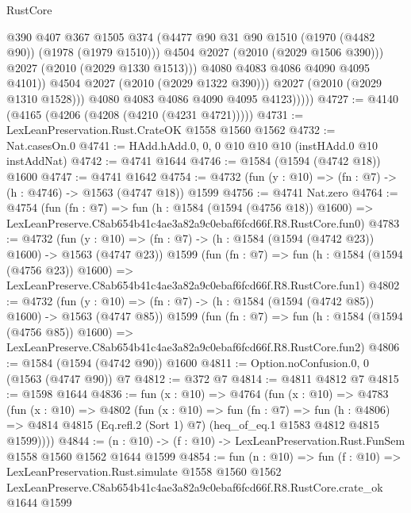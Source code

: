 \begin{lexlean}{RustCore}
\begin{coremodule}
                          @390
                          @407
                          @367
                          @1505
                          @374
                          (@4477 @90 @31 @90 @1510 (@1970 (@4482 @90)) (@1978 (@1979 @1510)))
                          @4504
                          @2027
                          (@2010 (@2029 @1506 @390)))
                        @2027
                        (@2010 (@2029 @1330 @1513)))
                      @4080
                      @4083
                      @4086
                      @4090
                      @4095
                      @4101))
                  @4504
                  @2027
                  (@2010 (@2029 @1322 @390)))
                @2027
                (@2010 (@2029 @1310 @1528)))
              @4080
              @4083
              @4086
              @4090
              @4095
              @4123)))))
@4727 := @4140 (@4165 (@4206 (@4208 (@4210 (@4231 @4721)))))
@4731 := LexLeanPreservation.Rust.CrateOK @1558 @1560 @1562
@4732 := Nat.casesOn.{0}
@4741 := HAdd.hAdd.{0, 0, 0} @10 @10 @10 (instHAdd.{0} @10 instAddNat)
@4742 := @4741 @1644
@4746 := @1584 (@1594 (@4742 @18)) @1600
@4747 := @4741 @1642
@4754 := @4732 (fun (y : @10) => (fn : @7) -> (h : @4746) -> @1563 (@4747 @18)) @1599
@4756 := @4741 Nat.zero
@4764 := @4754
    (fun (fn : @7) =>
    fun (h : @1584 (@1594 (@4756 @18)) @1600) =>
    LexLeanPreserve.C8ab654b41c4ae3a82a9c0ebaf6fcd66f.R8.RustCore.fun0)
@4783 := @4732
    (fun (y : @10) => (fn : @7) -> (h : @1584 (@1594 (@4742 @23)) @1600) -> @1563 (@4747 @23))
    @1599
    (fun (fn : @7) =>
    fun (h : @1584 (@1594 (@4756 @23)) @1600) =>
    LexLeanPreserve.C8ab654b41c4ae3a82a9c0ebaf6fcd66f.R8.RustCore.fun1)
@4802 := @4732
    (fun (y : @10) => (fn : @7) -> (h : @1584 (@1594 (@4742 @85)) @1600) -> @1563 (@4747 @85))
    @1599
    (fun (fn : @7) =>
    fun (h : @1584 (@1594 (@4756 @85)) @1600) =>
    LexLeanPreserve.C8ab654b41c4ae3a82a9c0ebaf6fcd66f.R8.RustCore.fun2)
@4806 := @1584 (@1594 (@4742 @90)) @1600
@4811 := Option.noConfusion.{0, 0} (@1563 (@4747 @90)) @7
@4812 := @372 @7
@4814 := @4811 @4812 @7
@4815 := @1598 @1644
@4836 := fun (x : @10) =>
  @4764
    (fun (x : @10) =>
    @4783
      (fun (x : @10) =>
      @4802
        (fun (x : @10) =>
        fun (fn : @7) =>
        fun (h : @4806) =>
        @4814 @4815 (Eq.refl.{2} (Sort 1) @7) (heq_of_eq.{1} @1583 @4812 @4815 @1599))))
@4844 := (n : @10) -> (f : @10) -> LexLeanPreservation.Rust.FunSem @1558 @1560 @1562 @1644 @1599
@4854 := fun (n : @10) =>
  fun (f : @10) =>
  LexLeanPreservation.Rust.simulate
    @1558
    @1560
    @1562
    LexLeanPreserve.C8ab654b41c4ae3a82a9c0ebaf6fcd66f.R8.RustCore.crate_ok
    @1644
    @1599
\end{coremodule}
\end{lexlean}
